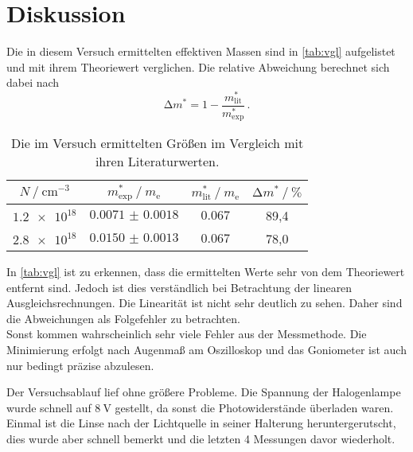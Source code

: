 \newpage
\section{Diskussion}

\noindent Die in diesem Versuch ermittelten effektiven Massen sind in \autoref{tab:vgl} aufgelistet und mit ihrem Theoriewert verglichen. 
Die relative Abweichung berechnet sich dabei nach
\begin{equation*}
    \increment m^* = 1 - \frac{m^*_\text{lit}}{m^*_\text{exp}} \, .
\end{equation*}

\begin{table}
    \centering
    \caption{Die im Versuch ermittelten Größen im Vergleich mit ihren Literaturwerten.}
    \label{tab:vgl}
    \begin{tabular}{c c c c}
        \toprule
        {$N \mathbin{/} \si{\centi\metre\tothe{-3}}$} & {$m^*_\text{exp} \mathbin{/} m_\text{e}$} & {$m^*_\text{lit} \mathbin{/} m_\text{e}$ \cite{effmass}} & {$\increment m^* \mathbin{/} \si{\percent}$}\\ 
        \midrule
        $\num{1.2e18}$ & $\num{0.0071(18)}$ & $\num{0.067}$ & 89,4 \\
        $\num{2.8e18}$ & $\num{0.0150(13)}$ & $\num{0.067}$ & 78,0 \\
        \bottomrule
    \end{tabular}
\end{table}

\noindent In \autoref{tab:vgl} ist zu erkennen, dass die ermittelten Werte sehr von dem Theoriewert entfernt sind. Jedoch ist dies verständlich bei 
Betrachtung der linearen Ausgleichsrechnungen. Die Linearität ist nicht sehr deutlich zu sehen. Daher sind die Abweichungen als Folgefehler zu betrachten. \\
Sonst kommen wahrscheinlich sehr viele Fehler aus der Messmethode. Die Minimierung erfolgt nach Augenmaß am Oszilloskop und das Goniometer ist auch nur 
bedingt präzise abzulesen.

\noindent Der Versuchsablauf lief ohne größere Probleme. Die Spannung der Halogenlampe wurde schnell auf $\SI{8}{\volt}$ gestellt, da sonst die 
Photowiderstände überladen waren. Einmal ist die Linse nach der Lichtquelle in seiner Halterung heruntergerutscht, dies wurde aber schnell bemerkt und die 
letzten 4 Messungen davor wiederholt.
